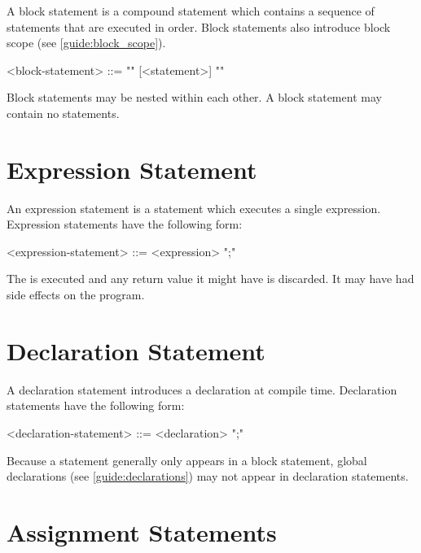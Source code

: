 A block statement is a compound statement which contains a sequence of statements that are executed in order. Block statements also introduce block scope (see \ref{guide:block_scope}).

\begin{minip}
\begin{grammar}
<block-statement> ::=
"{" [<statement>] "}"
\end{grammar}
\end{minip}

Block statements may be nested within each other. A block statement may contain no statements. 

\section{Expression Statement} \label{guide:expr_stmt}

An expression statement is a statement which executes a single expression. Expression statements have the following form:

\begin{minip}
\begin{grammar}
<expression-statement> ::=
<expression> ";"
\end{grammar}
\end{minip}

The  is executed and any return value it might have is discarded. It may have had side effects on the program.

\section{Declaration Statement} \label{guide:decl_stmt}

A declaration statement introduces a declaration at compile time. Declaration statements have the following form:

\begin{minip}
\begin{grammar}
<declaration-statement> ::=
<declaration> ";"
\end{grammar}
\end{minip}

Because a statement generally only appears in a block statement, global declarations (see \ref{guide:declarations}) may not appear in declaration statements. 

\section{Assignment Statements} \label{guide:assign_stmt}

